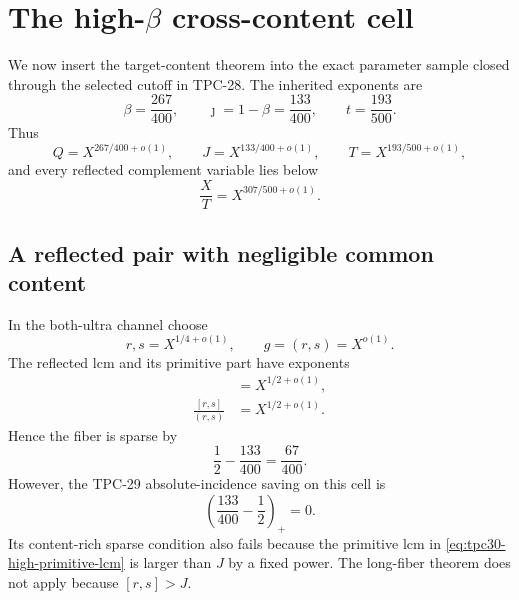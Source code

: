 \section{The high-\texorpdfstring{$\beta$}{beta} cross-content cell}
\label{sec:tpc30-high-beta}

We now insert the target-content theorem into the exact parameter
sample closed through the selected cutoff in TPC-28.  The inherited
exponents are
\begin{equation}
 \beta=\frac{267}{400},\qquad
 \jmath=1-\beta=\frac{133}{400},\qquad
 t=\frac{193}{500}.
 \label{eq:tpc30-high-parameters}
\end{equation}
Thus
\begin{equation}
 Q=X^{267/400+o(1)},\qquad
 J=X^{133/400+o(1)},\qquad
 T=X^{193/500+o(1)},
 \label{eq:tpc30-high-scales}
\end{equation}
and every reflected complement variable lies below
\begin{equation}
 \frac XT=X^{307/500+o(1)}.
 \label{eq:tpc30-reflected-ceiling}
\end{equation}

\subsection{A reflected pair with negligible common content}

In the both-ultra channel choose
\begin{equation}
 r,s=X^{1/4+o(1)},\qquad
 g=(r,s)=X^{o(1)}.
 \label{eq:tpc30-high-reflected-cell}
\end{equation}
The reflected lcm and its primitive part have exponents
\begin{align}
 [r,s]&=X^{1/2+o(1)},\label{eq:tpc30-high-lcm}\\
 \frac{[r,s]}{(r,s)}
 &=X^{1/2+o(1)}.\label{eq:tpc30-high-primitive-lcm}
\end{align}
Hence the fiber is sparse by
\begin{equation}
 \frac12-\frac{133}{400}
 =\boxed{\frac{67}{400}}.
 \label{eq:tpc30-high-sparse-margin}
\end{equation}
However, the TPC-29 absolute-incidence saving on this cell is
\begin{equation}
 \left(\frac{133}{400}-\frac12\right)_+
 =\boxed{0}.
 \label{eq:tpc30-old-zero-saving}
\end{equation}
Its content-rich sparse condition also fails because the primitive
lcm in \eqref{eq:tpc30-high-primitive-lcm} is larger than $J$ by a
fixed power.  The long-fiber theorem does not apply because
$[r,s]>J$.

